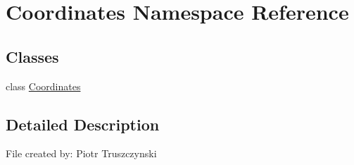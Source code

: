 \hypertarget{namespaceCoordinates}{}\section{Coordinates Namespace Reference}
\label{namespaceCoordinates}
\subsection*{Classes}
\begin{DoxyCompactItemize}
\item 
class \hyperlink{classCoordinates_1_1Coordinates}{Coordinates}
\end{DoxyCompactItemize}


\subsection{Detailed Description}
\begin{DoxyVerb}File created by: Piotr Truszczynski
\end{DoxyVerb}
 